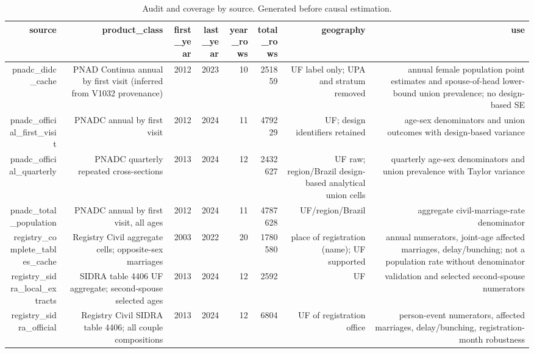 \begin{table}[!htbp]
\centering
\caption{Audit and coverage by source. Generated before causal estimation.} 
\label{tab:audit_coverage}
\begingroup\small
\begin{tabular}{rrrrrrrr}
  \hline
source & product\_class & first\_year & last\_year & year\_rows & total\_rows & geography & use \\ 
  \hline
pnadc\_didc\_cache & PNAD Continua annual by first visit (inferred from V1032 provenance) & 2012 & 2023 & 10 & 251859 & UF label only; UPA and stratum removed & annual female population point estimates and spouse-of-head lower-bound union prevalence; no design-based SE \\ 
  pnadc\_official\_first\_visit & PNADC annual by first visit & 2012 & 2024 & 11 & 479229 & UF; design identifiers retained & age-sex denominators and union outcomes with design-based variance \\ 
  pnadc\_official\_quarterly & PNADC quarterly repeated cross-sections & 2013 & 2024 & 12 & 2432627 & UF raw; region/Brazil design-based analytical union cells & quarterly age-sex denominators and union prevalence with Taylor variance \\ 
  pnadc\_total\_population & PNADC annual by first visit, all ages & 2012 & 2024 & 11 & 4787628 & UF/region/Brazil & aggregate civil-marriage-rate denominator \\ 
  registry\_complete\_tables\_cache & Registry Civil aggregate cells; opposite-sex marriages & 2003 & 2022 & 20 & 1780580 & place of registration (name); UF supported & annual numerators, joint-age affected marriages, delay/bunching; not a population rate without denominator \\ 
  registry\_sidra\_local\_extracts & SIDRA table 4406 UF aggregate; second-spouse selected ages & 2013 & 2024 & 12 & 2592 & UF & validation and selected second-spouse numerators \\ 
  registry\_sidra\_official & Registry Civil SIDRA table 4406; all couple compositions & 2013 & 2024 & 12 & 6804 & UF of registration office & person-event numerators, affected marriages, delay/bunching, registration-month robustness \\ 
   \hline
\end{tabular}
\endgroup
\end{table}
